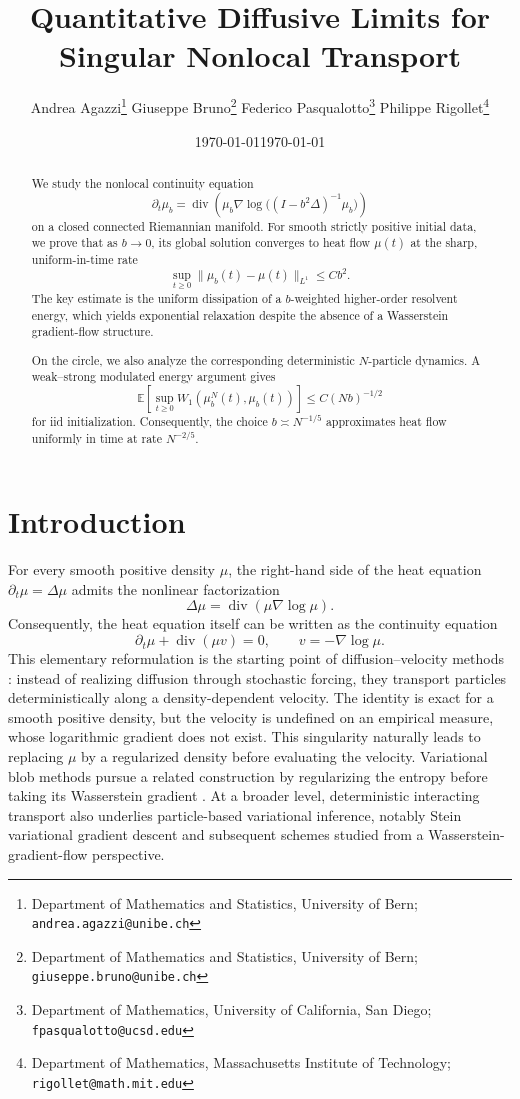 \documentclass[11pt]{article}
\title{\vspace{-1cm} Quantitative Diffusive Limits for Singular Nonlocal Transport}
\author{
Andrea Agazzi\thanks{
Department of Mathematics and Statistics, University of Bern;
\texttt{andrea.agazzi@unibe.ch}}
\quad
Giuseppe Bruno\thanks{
Department of Mathematics and Statistics, University of Bern;
\texttt{giuseppe.bruno@unibe.ch}}
\quad
Federico Pasqualotto\thanks{
Department of Mathematics, University of California, San Diego;
\texttt{fpasqualotto@ucsd.edu}}
\quad
Philippe Rigollet\thanks{
Department of Mathematics, Massachusetts Institute of Technology;
\texttt{rigollet@math.mit.edu}}
}
\date{\today}
\date{\today}
\theoremstyle{definition}
\begin{document}
\maketitle

\begin{abstract}
We study the nonlocal continuity equation
\[
\partial_t\mu_b
=\operatorname{div}\!\left(
\mu_b\nabla\log\bigl((I-b^2\Delta)^{-1}\mu_b\bigr)
\right)
\]
on a closed connected Riemannian manifold. For smooth strictly positive
initial data, we prove that as $b \to 0$, its global solution converges to heat flow $\mu(t)$ at the
sharp, uniform-in-time rate
\[
\sup_{t\ge0}\|\mu_b(t)-\mu(t)\|_{L^1}\le Cb^2.
\]
The key estimate is the uniform dissipation of a $b$-weighted higher-order
resolvent energy, which yields exponential relaxation despite the absence of
a Wasserstein gradient-flow structure. 

On the circle, we
also analyze the corresponding deterministic $N$-particle dynamics. A weak--strong modulated energy argument gives
\[
\mathbb E\!\left[
\sup_{t\ge0}W_1(\mu_b^N(t),\mu_b(t))
\right]
\le C(Nb)^{-1/2}
\]
for iid initialization. Consequently, the choice $b\asymp N^{-1/5}$
approximates heat flow uniformly in time at rate $N^{-2/5}$.
\end{abstract}






\section{Introduction}\label{sec:setting}\label{sec:framework}

For every smooth positive density $\mu$, the right-hand side of the heat
equation $\partial_t\mu=\Delta\mu$ admits the nonlinear factorization
\[
\Delta\mu=\operatorname{div}(\mu\nabla\log\mu).
\]
Consequently, the heat equation itself can be written as the continuity
equation
\[
\partial_t\mu+\operatorname{div}(\mu v)=0,
\qquad v=-\nabla\log\mu.
\]
This elementary reformulation is the starting point of diffusion--velocity
methods
\cite{degond1990deterministic,lacombe1999presentation,lions2001methode}:
instead of realizing diffusion through stochastic forcing, they transport
particles deterministically along a density-dependent velocity. The identity
is exact for a smooth positive density, but the velocity is undefined on an
empirical measure, whose logarithmic gradient does not exist. This singularity
naturally leads to replacing $\mu$ by a regularized density before evaluating
the velocity. Variational blob methods pursue a related construction by
regularizing the entropy before taking its Wasserstein gradient
\cite{carrillo2019blob}. At a broader level, deterministic interacting
transport also underlies particle-based variational inference, notably Stein
variational gradient descent
\cite{liu2016svgd} and subsequent schemes studied from a
Wasserstein-gradient-flow perspective.
\end{document}
